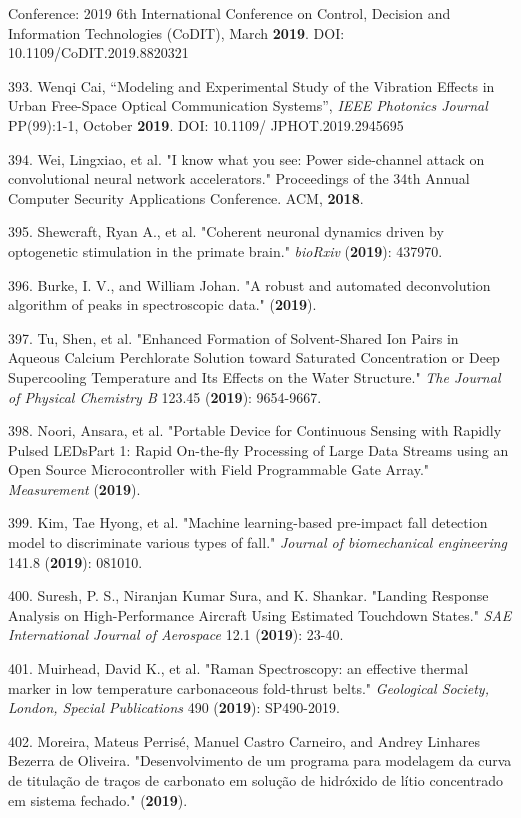 Conference: 2019 6th International Conference on Control, Decision and Information Technologies (CoDIT), March \textbf{2019}. DOI: 10.1109/CoDIT.2019.8820321

393. Wenqi Cai, ``Modeling and Experimental Study of the Vibration Effects in Urban Free-Space Optical Communication Systems'', \textit{IEEE Photonics Journal} PP(99):1-1, October \textbf{2019}. DOI: 10.1109/ JPHOT.2019.2945695

394. Wei, Lingxiao, et al. "I know what you see: Power side-channel attack on convolutional neural network accelerators." Proceedings of the 34th Annual Computer Security Applications Conference. ACM, \textbf{2018}.

395. Shewcraft, Ryan A., et al. "Coherent neuronal dynamics driven by optogenetic stimulation in the primate brain." \textit{bioRxiv} (\textbf{2019}): 437970.

396. Burke, I. V., and William Johan. "A robust and automated deconvolution algorithm of peaks in spectroscopic data." (\textbf{2019}).

397. Tu, Shen, et al. "Enhanced Formation of Solvent-Shared Ion Pairs in Aqueous Calcium Perchlorate Solution toward Saturated Concentration or Deep Supercooling Temperature and Its Effects on the Water Structure." \textit{The Journal of Physical Chemistry B} 123.45 (\textbf{2019}): 9654-9667.

398. Noori, Ansara, et al. "Portable Device for Continuous Sensing with Rapidly Pulsed LEDs\textendash{}Part 1: Rapid On-the-fly Processing of Large Data Streams using an Open Source Microcontroller with Field Programmable Gate Array." \textit{Measurement} (\textbf{2019}).

399. Kim, Tae Hyong, et al. "Machine learning-based pre-impact fall detection model to discriminate various types of fall." \textit{Journal of biomechanical engineering} 141.8 (\textbf{2019}): 081010.

400. Suresh, P. S., Niranjan Kumar Sura, and K. Shankar. "Landing Response Analysis on High-Performance Aircraft Using Estimated Touchdown States." \textit{SAE International Journal of Aerospace} 12.1 (\textbf{2019}): 23-40.

401. Muirhead, David K., et al. "Raman Spectroscopy: an effective thermal marker in low temperature carbonaceous fold-thrust belts." \textit{Geological Society, London, Special Publications} 490 (\textbf{2019}): SP490-2019.

402. Moreira, Mateus Perris\'{e}, Manuel Castro Carneiro, and Andrey Linhares Bezerra de Oliveira. "Desenvolvimento de um programa para modelagem da curva de titula\c{c}\~{a}o de tra\c{c}os de carbonato em solu\c{c}\~{a}o de hidr\'{o}xido de l\'{i}tio concentrado em sistema fechado." (\textbf{2019}).

